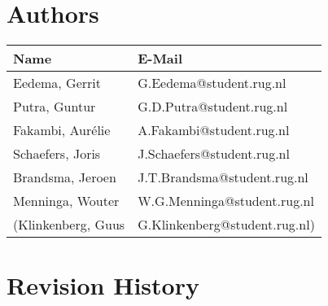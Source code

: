\section*{Authors}

\begin{tabular}{L{} L{}}
    \textbf{Name} & \textbf{E-Mail} \\ \toprule
	Eedema, Gerrit & G.Eedema@student.rug.nl\\
	Putra, Guntur & G.D.Putra@student.rug.nl\\
	Fakambi, Aur\'{e}lie & A.Fakambi@student.rug.nl\\
	Schaefers, Joris & J.Schaefers@student.rug.nl\\
	Brandsma, Jeroen & J.T.Brandsma@student.rug.nl\\
	Menninga, Wouter & W.G.Menninga@student.rug.nl\\ 
	(Klinkenberg, Guus & G.Klinkenberg@student.rug.nl)\\ \bottomrule
\end{tabular}

\section*{Revision History}

